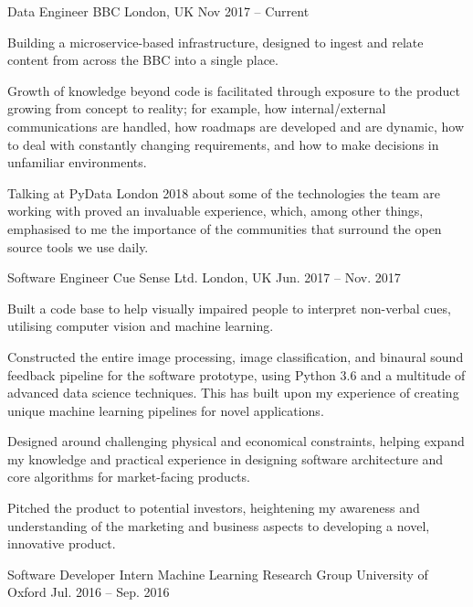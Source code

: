 \begin{cventries}
    \cventry
    {Data Engineer}
    {BBC}
    {London, UK}
    {Nov 2017 – Current}
    {
      \begin{_cvitems}
        \item{Building a microservice-based infrastructure, designed to ingest and relate content from across the BBC into a single place.}
        \item{Growth of knowledge beyond code is facilitated through exposure to the product growing from concept to reality; for example, how internal/external communications are handled, how roadmaps are developed and are dynamic, how to deal with constantly changing requirements, and how to make decisions in unfamiliar environments.}
        \item{Talking at PyData London 2018 about some of the technologies the team are working with proved an invaluable experience, which, among other things, emphasised to me the importance of the communities that surround the open source tools we use daily.}
      \end{_cvitems}
    }
    \cventry
    {Software Engineer}
    {Cue Sense Ltd.}
    {London, UK}
    {Jun. 2017 – Nov. 2017}
    {
      \begin{_cvitems}
        \item {Built a code base to help visually impaired people to interpret non-verbal cues, utilising computer vision and machine learning.}
        \item {Constructed the entire image processing, image classification, and binaural sound feedback pipeline for the software prototype, using Python 3.6 and a multitude of advanced data science techniques. This has built upon my experience of creating unique machine learning pipelines for novel applications.}
        \item {Designed around challenging physical and economical constraints, helping expand my knowledge and practical experience in designing software architecture and core algorithms for market-facing products.}
        \item {Pitched the product to potential investors, heightening my awareness and understanding of the marketing and business aspects to developing a novel, innovative product.}
      \end{_cvitems}
    }
    \cventry
    {Software Developer Intern}
    {Machine Learning Research Group}
    {University of Oxford}
    {Jul. 2016 – Sep. 2016}
    {
      \begin{_cvitems}

\end{_cvitems}}
\end{cventries}

